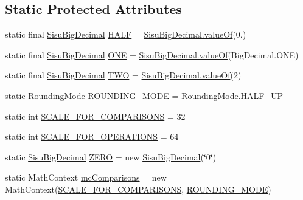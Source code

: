 \subsection*{Static Protected Attributes}
\begin{DoxyCompactItemize}
\item 
static final \hyperlink{classcom_1_1aarrelaakso_1_1drawl_1_1_sisu_big_decimal}{Sisu\+Big\+Decimal} \hyperlink{classcom_1_1aarrelaakso_1_1drawl_1_1_sisu_big_decimal_ae01ee6ac57cabf393e59465704a62f2c}{H\+A\+LF} = \hyperlink{classcom_1_1aarrelaakso_1_1drawl_1_1_sisu_big_decimal_a076ac8cd04ac04e39f7f3fcc7ce9a4a1}{Sisu\+Big\+Decimal.\+value\+Of}(0.)
\item 
static final \hyperlink{classcom_1_1aarrelaakso_1_1drawl_1_1_sisu_big_decimal}{Sisu\+Big\+Decimal} \hyperlink{classcom_1_1aarrelaakso_1_1drawl_1_1_sisu_big_decimal_a50a879aa4cb7468400bc4b0f2927f7f0}{O\+NE} = \hyperlink{classcom_1_1aarrelaakso_1_1drawl_1_1_sisu_big_decimal_a076ac8cd04ac04e39f7f3fcc7ce9a4a1}{Sisu\+Big\+Decimal.\+value\+Of}(Big\+Decimal.\+O\+NE)
\item 
static final \hyperlink{classcom_1_1aarrelaakso_1_1drawl_1_1_sisu_big_decimal}{Sisu\+Big\+Decimal} \hyperlink{classcom_1_1aarrelaakso_1_1drawl_1_1_sisu_big_decimal_a31b16f357b73bac1eef7b45326887b23}{T\+WO} = \hyperlink{classcom_1_1aarrelaakso_1_1drawl_1_1_sisu_big_decimal_a076ac8cd04ac04e39f7f3fcc7ce9a4a1}{Sisu\+Big\+Decimal.\+value\+Of}(2)
\item 
static Rounding\+Mode \hyperlink{classcom_1_1aarrelaakso_1_1drawl_1_1_sisu_big_decimal_afcdca984f764db570786fff2442142cb}{R\+O\+U\+N\+D\+I\+N\+G\+\_\+\+M\+O\+DE} = Rounding\+Mode.\+H\+A\+L\+F\+\_\+\+UP
\item 
static int \hyperlink{classcom_1_1aarrelaakso_1_1drawl_1_1_sisu_big_decimal_a5d8592149ed329cfd2f80ec81e790a9e}{S\+C\+A\+L\+E\+\_\+\+F\+O\+R\+\_\+\+C\+O\+M\+P\+A\+R\+I\+S\+O\+NS} = 32
\item 
static int \hyperlink{classcom_1_1aarrelaakso_1_1drawl_1_1_sisu_big_decimal_a5dfdeb68abdc4865a00b27136c6e8c54}{S\+C\+A\+L\+E\+\_\+\+F\+O\+R\+\_\+\+O\+P\+E\+R\+A\+T\+I\+O\+NS} = 64
\item 
static \hyperlink{classcom_1_1aarrelaakso_1_1drawl_1_1_sisu_big_decimal}{Sisu\+Big\+Decimal} \hyperlink{classcom_1_1aarrelaakso_1_1drawl_1_1_sisu_big_decimal_a5722f4f25f56502bda610b56ec3857be}{Z\+E\+RO} = new \hyperlink{classcom_1_1aarrelaakso_1_1drawl_1_1_sisu_big_decimal}{Sisu\+Big\+Decimal}(\char`\"{}0\char`\"{})
\item 
static Math\+Context \hyperlink{classcom_1_1aarrelaakso_1_1drawl_1_1_sisu_big_decimal_a9fa3952ce422ce15868eb125788d9054}{mc\+Comparisons} = new Math\+Context(\hyperlink{classcom_1_1aarrelaakso_1_1drawl_1_1_sisu_big_decimal_a5d8592149ed329cfd2f80ec81e790a9e}{S\+C\+A\+L\+E\+\_\+\+F\+O\+R\+\_\+\+C\+O\+M\+P\+A\+R\+I\+S\+O\+NS}, \hyperlink{classcom_1_1aarrelaakso_1_1drawl_1_1_sisu_big_decimal_afcdca984f764db570786fff2442142cb}{R\+O\+U\+N\+D\+I\+N\+G\+\_\+\+M\+O\+DE})

\end{DoxyCompactItemize}
